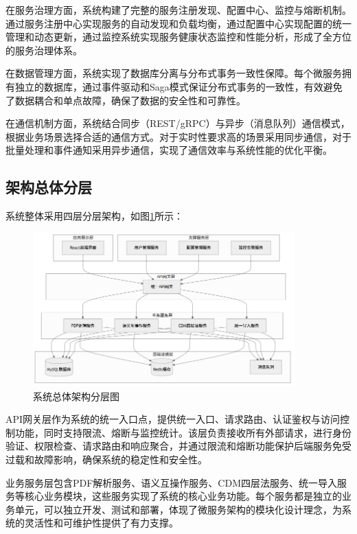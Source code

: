 在服务治理方面，系统构建了完整的服务注册发现、配置中心、监控与熔断机制。通过服务注册中心实现服务的自动发现和负载均衡，通过配置中心实现配置的统一管理和动态更新，通过监控系统实现服务健康状态监控和性能分析，形成了全方位的服务治理体系。

在数据管理方面，系统实现了数据库分离与分布式事务一致性保障。每个微服务拥有独立的数据库，通过事件驱动和Saga模式保证分布式事务的一致性，有效避免了数据耦合和单点故障，确保了数据的安全性和可靠性。

在通信机制方面，系统结合同步（REST/gRPC）与异步（消息队列）通信模式，根据业务场景选择合适的通信方式。对于实时性要求高的场景采用同步通信，对于批量处理和事件通知采用异步通信，实现了通信效率与系统性能的优化平衡。

\subsection{架构总体分层}

系统整体采用四层分层架构，如图\ref{fig:system_architecture}所示：

\begin{figure}[H]
    \centering
    \includegraphics[width=0.9\textwidth]{chapters/fig-0/system_architecture_simple.png}
    \caption{系统总体架构分层图}
    \label{fig:system_architecture}
\end{figure}

API网关层作为系统的统一入口点，提供统一入口、请求路由、认证鉴权与访问控制功能，同时支持限流、熔断与监控统计。该层负责接收所有外部请求，进行身份验证、权限检查、请求路由和响应聚合，并通过限流和熔断功能保护后端服务免受过载和故障影响，确保系统的稳定性和安全性。

业务服务层包含PDF解析服务、语义互操作服务、CDM四层法服务、统一导入服务等核心业务模块，这些服务实现了系统的核心业务功能。每个服务都是独立的业务单元，可以独立开发、测试和部署，体现了微服务架构的模块化设计理念，为系统的灵活性和可维护性提供了有力支撑。

